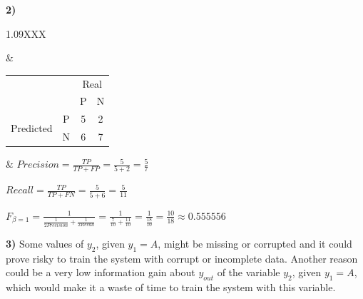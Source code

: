 \documentclass[11pt,a4paper]{article}
\begin{document}
\begin{flushleft}
  \textbf{2)}
  \small
  \hspace{-8.25mm}
  \vspace{4mm}
  \begin{tabularx}{1.09\textwidth}{XXX}

    \begin{tikzpicture}[node/.style={draw,rectangle}, ->]
      \node [node] (node_1) {$y_1$};
      \path (node_1) ++ (-135:2) node [node] (node_2) {P (5/7)};
      \path (node_1) ++ (-45:2) node [node] (node_3) {N (7/13)};
      \draw (node_1) -- (node_2) node [left,pos=0.25] {A\hspace{2mm} }(node_1);
      \draw (node_1) -- (node_3) node [right,pos=0.25] {\hspace{2mm}B}(node_1);
    \end{tikzpicture}                                                         &

    \begin{tabular}{llcc}
                                                      &                        & \multicolumn{2}{c}{Real}                          \\ \cline{3-4}
                                                      & \multicolumn{1}{l|}{}  & \multicolumn{1}{c|}{P}   & \multicolumn{1}{c|}{N} \\ \cline{2-4}
      \multicolumn{1}{c|}{\multirow{2}{*}{Predicted}} & \multicolumn{1}{c|}{P} & \multicolumn{1}{c|}{5}   & \multicolumn{1}{c|}{2} \\ \cline{2-4}
      \multicolumn{1}{c|}{}                           & \multicolumn{1}{c|}{N} & \multicolumn{1}{c|}{6}   & \multicolumn{1}{c|}{7} \\ \cline{2-4}
    \end{tabular} &
    \normalsize
    $ Precision = \frac{TP}{TP + FP} = \frac{5}{5 + 2} = \frac{5}{7} $ \par
    $ Recall = \frac{TP}{TP + FN} = \frac{5}{5 + 6} = \frac{5}{11} $
  \end{tabularx}
  \vspace{0mm}
  \normalsize
  $ F_{\beta = 1} = \frac{1}{\frac{1}{2Precision} + \frac{1}{2Recall}} = \frac{1}{\frac{7}{10} + \frac{11}{10}} = \frac{1}{\frac{18}{10}} = \frac{10}{18} \approx 0.555556 $ \par
\end{flushleft}
\vspace*{2mm}

\begin{flushleft}
  \textbf{3)}
  Some values of $y_2$, given $y_1 = A$, might be missing or corrupted and it could prove risky to train the system with corrupt or incomplete data. Another reason could be a very low information gain about $y_{out}$ of the variable $y_2$, given $y_1 = A$, which would make it a waste of time to train the system with this variable. \par
\end{flushleft}
\vspace*{2mm}
\end{document}
